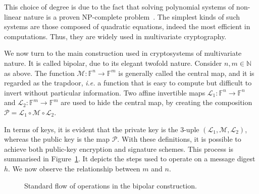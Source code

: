 \documentclass[openright]{report}
\begin{document}
This choice of degree is due to the fact that solving polynomial systems of non-linear nature is a proven NP-complete problem~\cite[Theorem 10]{Fraenkel:197909:article}. The simplest kinds of such systems are those composed of quadratic equations, indeed the most efficient in computations. Thus, they are widely used in multivariate cryptography.

We now turn to the main construction used in cryptosystems of multivariate nature. It is called bipolar, due to its elegant twofold nature. Consider $n, m \in \mathbb{N}$ as above. The function $\mathcal{M}: \mathbb{F}^{n} \to \mathbb{F}^{m}$ is generally called the central map, and it is regarded as the trapdoor, \emph{i.e.} a function that is easy to compute but difficult to invert without particular information. Two affine invertible maps $\mathcal{L}_{1} : \mathbb{F}^{n} \to \mathbb{F}^{n}$ and $\mathcal{L}_{2} : \mathbb{F}^{m} \to \mathbb{F}^{m}$ are used to hide the central map, by creating the composition $\mathcal{P} = \mathcal{L}_{1} \circ \mathcal{M} \circ \mathcal{L}_{2}$.

In terms of keys, it is evident that the private key is the $3$-uple $(\mathcal{L}_{1}, \mathcal{M}, \mathcal{L}_{2})$, whereas the public key is the map $\mathcal{P}$. With these definitions, it is possible to achieve both public-key encryption and signature schemes. 
This process is summarised in Figure~\ref{fig:2}. It depicts the steps used to operate on a message digest $h$. We now observe the relationship between $m$ and $n$.

\begin{figure}[htbp]
  \centering
  \caption{Standard flow of operations in the bipolar construction.}\label{fig:2}
\end{figure}
\end{document}

